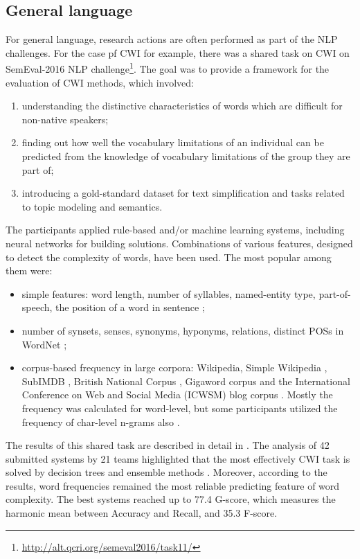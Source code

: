 \subsection{General language}
For general language, research actions are often performed as part of the NLP challenges. For the case pf CWI for example, there was a shared task on CWI on SemEval-2016 NLP challenge\footnote{\url{http://alt.qcri.org/semeval2016/task11/}}. The goal was to provide a framework for the evaluation of CWI methods, which involved:
\begin{enumerate}
    \item understanding the distinctive characteristics of words which are difficult for non-native speakers;
    \item finding out how well the vocabulary limitations of an individual can be predicted from the knowledge of vocabulary limitations of the group they are part of;
    \item introducing a gold-standard dataset for text simplification and tasks related to topic modeling and semantics.
\end{enumerate}

The participants applied rule-based and/or
machine learning systems, including neural networks for building solutions.
Combinations of various features, designed
to detect the complexity of words, have been used. The most popular among them were: 

\begin{itemize}
    \item simple features: word length, number of syllables, named-entity type, part-of-speech, the position of a word in sentence \citep{Bingel-SemEval2016};
    
    \item number of synsets, senses, synonyms, hyponyms, relations, distinct POSs in WordNet \citep{Ronzano-SemEval2016};
    
    \item corpus-based frequency in large corpora: Wikipedia, Simple Wikipedia \citep{Kauchak-2013}, SubIMDB \citep{Paetzold-SemEval2016solution}, British National Corpus \citep{Ronzano-SemEval2016}, Gigaword corpus and the International Conference on Web and Social Media (ICWSM) blog corpus \citep{Brooke-SemEval2016}. Mostly the frequency was calculated for word-level, but some participants utilized the frequency of char-level n-grams also \citep{Bingel-SemEval2016}.
\end{itemize}

The results of this shared task are described in detail in \cite{Paetzold-SemEval2016overview}. The analysis of 42 submitted systems by 21 teams highlighted that the most effectively CWI task is solved by decision trees \citep{Malmasi-SemEval2016} and ensemble methods \citep{Paetzold-SemEval2016solution, Ronzano-SemEval2016}. Moreover, according to the results, word frequencies remained the most reliable predicting feature of word complexity. The best systems reached up to 77.4 G-score, which measures the harmonic mean between Accuracy and Recall, and 35.3 F-score. 

